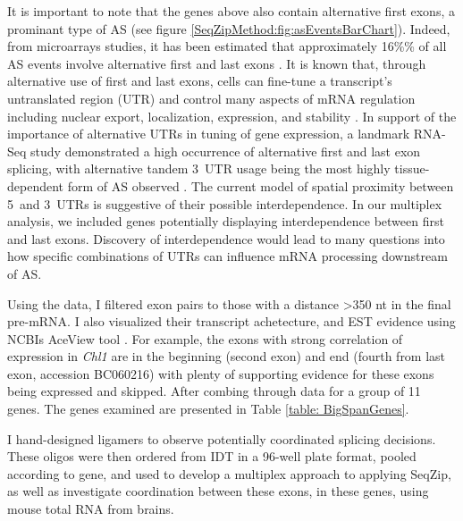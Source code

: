   It is important to note that the genes above also contain alternative first exons, a prominant type of AS (see figure \ref{SeqZipMethod:fig:asEventsBarChart}). Indeed, from microarrays studies, it has been estimated that approximately 16\%\% of all AS events involve alternative first and last exons \citep{Bingham2008}. It is known that, through alternative use of first and last exons, cells can fine-tune a transcript’s untranslated region (UTR) and control many aspects of mRNA regulation including nuclear export, localization, expression, and stability \citep{Hughes2006}. In support of the importance of alternative UTRs in tuning of gene expression, a landmark RNA-Seq study demonstrated a high occurrence of alternative first and last exon splicing, with alternative tandem 3\textprime~UTR usage being the most highly tissue-dependent form of AS observed \citep{Wang2008}. The current model of spatial proximity between 5\textprime~and 3\textprime~UTRs is suggestive of their possible interdependence. In our multiplex analysis, we included genes potentially displaying interdependence between first and last exons. Discovery of interdependence would lead to many questions into how specific combinations of UTRs can influence mRNA processing downstream of AS.

  Using the \citet{Fagnani2007} data, I filtered exon pairs to those with a distance >350 nt in the final pre-mRNA. I also visualized their transcript achetecture, and EST evidence using NCBIs AceView tool \citep{Thierry-Mieg2006}. For example, the exons with strong correlation of expression in \textit{Chl1} are in the beginning (second exon) and end (fourth from last exon, accession BC060216) with plenty of supporting evidence for these exons being expressed and skipped. After combing through \citep{Fagnani2007} data for a group of 11 genes. The genes examined are presented in Table \ref{table: BigSpanGenes}.

  

  I hand-designed ligamers to observe potentially coordinated splicing decisions. These oligos were then ordered from IDT in a 96-well plate format, pooled according to gene, and used to develop a multiplex approach to applying SeqZip, as well as investigate coordination between these exons, in these genes, using mouse total RNA from brains.


